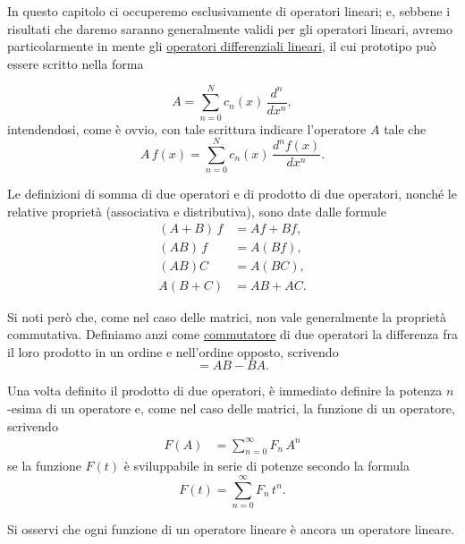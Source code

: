 \documentclass[11pt, a4paper]{book}
\numberwithin{equation}{section}
\begin{document}
In questo capitolo ci occuperemo esclusivamente di operatori lineari;
e, sebbene i risultati che daremo saranno generalmente validi per gli
operatori lineari, avremo particolarmente in mente gli
\uline{operatori differenziali lineari}, il cui prototipo può essere
scritto nella forma


\begin{equation}
A = \sum_{n=0}^{N} c_n(x)\,\frac{d^n}{dx^n},
\end{equation}
intendendosi, come è ovvio, con tale scrittura indicare l'operatore $A$
tale che
\begin{equation}
A\,f(x) = \sum_{n=0}^{N} c_n(x)\,\frac{d^n f(x)}{dx^n}.
\end{equation}

Le definizioni di somma di due operatori e di prodotto di due operatori,
nonché le relative proprietà (associativa e distributiva), sono date
dalle formule
\begin{align}
(A+B)\,f &= Af + Bf, \tag{6a} \\
(AB)\,f  &= A(Bf), \tag{6b} \\
(AB)C    &= A(BC), \tag{6c} \\
A(B+C)   &= AB + AC. \tag{6d}
\end{align}

Si noti però che, come nel caso delle matrici, non vale generalmente la
proprietà commutativa. Definiamo anzi come \uline{commutatore} di
due operatori la differenza fra il loro prodotto in un ordine e
nell'ordine opposto, scrivendo
\begin{equation}
[A,B] = AB - BA.
\end{equation}

Una volta definito il prodotto di due operatori, è immediato definire la
potenza $n$-esima di un operatore e, come nel caso delle matrici, la
funzione di un operatore, scrivendo
\begin{align}
F(A) &= \sum_{n=0}^{\infty} F_n\,A^n \tag{8a}
\end{align}
se la funzione $F(t)$ è sviluppabile in serie di potenze secondo la
formula
\begin{equation}
F(t) = \sum_{n=0}^{\infty} F_n\,t^n. \tag{8b}
\end{equation}


Si osservi che ogni funzione di un operatore lineare è ancora un
operatore lineare.
\end{document}
